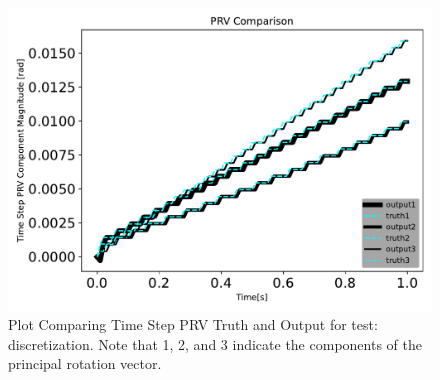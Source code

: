 \begin{figure}[htbp]\centerline{\includegraphics[height=0.7\textwidth, keepaspectratio]{AutoTeX/discretizationPRVcomparison}}\caption{Plot Comparing Time Step PRV Truth and Output for test: discretization. Note that 1, 2, and 3 indicate the components of the principal rotation vector.}\label{fig:discretizationPRVcomparison}\end{figure}